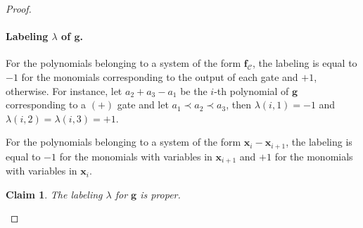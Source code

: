 \documentclass[10pt,a4paper]{article}
\newtheorem{claim}[theorem]{Claim}
\theoremstyle{definition}
\theoremstyle{remark}
\newcommand{\calC}{\mathcal{C}}
\newcommand{\vecf}{\ensuremath{\boldsymbol{f}}}
\newcommand{\vecg}{\ensuremath{\boldsymbol{g}}}
\newcommand{\vecx}{\ensuremath{\boldsymbol{x}}}
\begin{document}
\begin{proof}
        \medskip
        \paragraph{Labeling $\lambda$ of $\vecg$.} For the polynomials belonging to a
        system  of the form $\vecf_{\calC}$, the labeling is equal to
        $-1$ for the monomials corresponding to the output of each gate
        and $+1$, otherwise. For instance, let $a_2 + a_3 - a_1$ be the $i$-th
        polynomial of $\vecg$ corresponding to a $(+)$ gate and let
        $a_1 \prec a_2 \prec a_3$, then
        $\lambda(i,1) = -1$ and $\lambda(i,2) = \lambda(i,3) = +1$.

        For the polynomials belonging to a system of the form $\vecx_i - \vecx_{i+1}$,
        the labeling is equal to $-1$ for the monomials with variables in $\vecx_{i+1}$
        and $+1$ for the monomials with variables in  $\vecx_{i}$.

        \begin{claim}
          \label{cl:properLabelingForf1}
          The labeling $\lambda$ for $\vecg$ is proper.
        \end{claim}


\end{proof}
\end{document}
